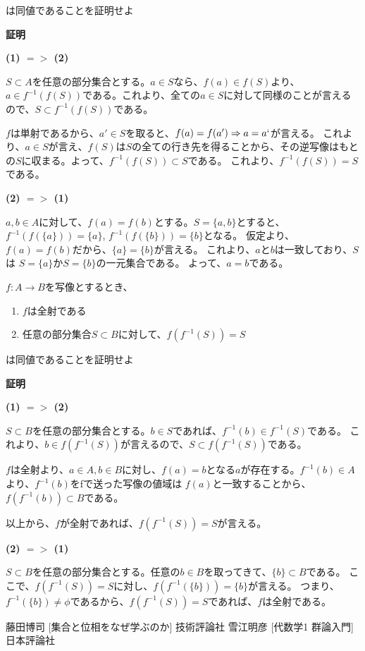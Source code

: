 \documentclass[dvipdfmx,autodetect-engine]{jsarticle}
\begin{document}
は同値であることを証明せよ

{\bf 証明}

{\bf (1) $ => $ (2)}

$S \subset A$を任意の部分集合とする。$a \in S$なら、$f(a) \in f(S)$より、
$a \in f^{-1}(f(S))$である。これより、全ての$a \in S$に対して同様のことが言えるので、$S \subset f^{-1}(f(S))$である。

$f$は単射であるから、$a' \in S$を取ると、$f(a) = f(a') \Rightarrow a = a`$が言える。
これより、$a \in S$が言え、$f(S)$は$S$の全ての行き先を得ることから、その逆写像はもとの$S$に収まる。よって、$f^{-1}(f(S)) \subset S$である。
これより、$f^{-1}(f(S)) = S$である。

{\bf (2) $ => $ (1)}

$a, b \in A$に対して、$f(a) = f(b)$とする。$S = \{a, b\}$とすると、
$f^{-1}(f(\{a\})) = \{a\}$, $f^{-1}(f(\{b\})) = \{b\}$となる。
仮定より、$f(a) = f(b)$だから、$\{a\} = \{b\}$が言える。
これより、$aとb$は一致しており、$S$は $S = \{a\}$か$S = \{b\}$の一元集合である。
よって、$a = b$である。


\exercise

$f:A \to B$を写像とするとき、

\begin{enumerate}
\renewcommand{\labelenumi}{(\arabic{enumi})}
	\item $f$は全射である
	\item 任意の部分集合$S \subset B$に対して、$f(f^{-1}(S)) = S$
\end{enumerate}

は同値であることを証明せよ

{\bf 証明}

{\bf (1) $ => $ (2)}

$S \subset B$を任意の部分集合とする。$b \in S$であれば、$f^{-1}(b) \in f^{-1}(S)$である。
これより、$b \in f(f^{-1}(S))$が言えるので、$S \subset f(f^{-1}(S))$である。

$f$は全射より、$a \in A, b \in B$に対し、$f(a) = b$となる$a$が存在する。$f^{-1}(b) \in A$より、$f^{-1}(b)$をfで送った写像の値域は $f(a)$と一致することから、$f(f^{-1}(b)) \subset B$である。

以上から、$f$が全射であれば、$f(f^{-1}(S)) = S$が言える。

{\bf (2) $ => $ (1)}

$S \subset B$を任意の部分集合とする。任意の$b \in B$を取ってきて、$\{b\} \subset B$である。
ここで、$f(f^{-1}(S)) = S$に対し、$f(f^{-1}(\{b\})) = \{b\}$が言える。
つまり、$f^{-1}(\{b\}) \neq \phi$であるから、$f(f^{-1}(S)) = S$であれば、$f$は全射である。


\begin{thebibliography}{n}
 藤田博司 [集合と位相をなぜ学ぶのか] 技術評論社
 雪江明彦 [代数学1 群論入門] 日本評論社
\end{thebibliography}
\end{document}

